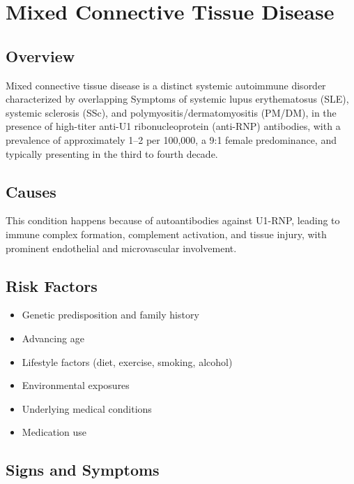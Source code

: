 \chapter{Mixed Connective Tissue Disease}
\label{sec:Mixed Connective Tissue Disease}

\section{Overview}
Mixed connective tissue disease is a distinct systemic autoimmune disorder characterized by overlapping Symptoms of systemic lupus erythematosus (SLE), systemic sclerosis (SSc), and polymyositis/dermatomyositis (PM/DM), in the presence of high-titer anti-U1 ribonucleoprotein (anti-RNP) antibodies, with a prevalence of approximately 1--2 per 100,000, a 9:1 female predominance, and typically presenting in the third to fourth decade.
\section{Causes}
This condition happens because of autoantibodies against U1-RNP, leading to immune complex formation, complement activation, and tissue injury, with prominent endothelial and microvascular involvement.     
\section{Risk Factors}

\begin{itemize}[noitemsep]
  \item Genetic predisposition and family history
  \item Advancing age
  \item Lifestyle factors (diet, exercise, smoking, alcohol)
  \item Environmental exposures
  \item Underlying medical conditions
  \item Medication use
\end{itemize}
\section{Signs and Symptoms}

